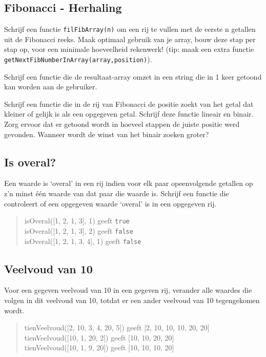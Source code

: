 \subsection{Fibonacci - Herhaling}

Schrijf een functie \texttt{filFibArray(n)} om een rij te vullen met de eerste n getallen uit de Fibonacci reeks. Maak optimaal gebruik van je array, bouw deze stap per stap op, voor een minimale hoeveelheid rekenwerk! (tip: maak een extra functie \texttt{getNextFibNumberInArray(array,position)}).

Schrijf een functie die de resultaat-array omzet in een string die in 1 keer getoond kan worden aan de gebruiker.

Schrijf een functie die in de rij van Fibonacci de positie zoekt van het getal dat kleiner of gelijk is als een opgegeven getal. Schrijf deze functie lineair en binair. Zorg ervoor dat er getoond wordt in hoeveel stappen de juiste positie werd gevonden. Wanneer wordt de winst van het binair zoeken groter?

\subsection{Is overal?}

Een waarde is `overal' in een rij indien voor elk paar opeenvolgende getallen op z'n minst \'e\'en waarde van dat paar die waarde is. Schrijf een functie die controleert of een opgegeven waarde `overal' is in een opgegeven rij.

\begin{quote}
isOveral([1, 2, 1, 3], 1) geeft \texttt{true} \\
isOveral([1, 2, 1, 3], 2) geeft \texttt{false} \\
isOveral([1, 2, 1, 3, 4], 1) geeft \texttt{false} \\
\end{quote}

\subsection{Veelvoud van 10}

Voor een gegeven veelvoud van 10 in een gegeven rij, verander alle waardes die volgen in dit veelvoud van 10, totdat er een ander veelvoud van 10 tegengekomen wordt.

\begin{quote}
tienVeelvoud([2, 10, 3, 4, 20, 5]) geeft [2, 10, 10, 10, 20, 20] \\
tienVeelvoud([10, 1, 20, 2]) geeft [10, 10, 20, 20] \\
tienVeelvoud([10, 1, 9, 20]) geeft [10, 10, 10, 20] \\
\end{quote}

